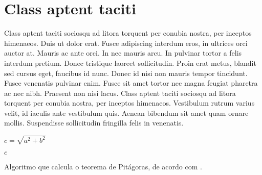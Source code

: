 \documentclass[rascunho,xindy]{fei}
\begin{document}
\section{Class aptent taciti}

Class aptent taciti sociosqu ad litora torquent per conubia nostra, per  inceptos himenaeos. Duis ut dolor erat. Fusce adipiscing interdum eros, in ultrices orci auctor at. Mauris ac ante orci. In nec mauris arcu. In pulvinar tortor a felis interdum pretium. Donec tristique laoreet sollicitudin. Proin erat metus, blandit sed cursus eget, faucibus id nunc. Donec id nisi non mauris tempor tincidunt. Fusce venenatis pulvinar enim. Fusce sit amet tortor nec magna feugiat pharetra ac nec nibh. Praesent non nisi lacus. Class aptent taciti sociosqu ad litora torquent per conubia nostra, per inceptos himenaeos. Vestibulum rutrum varius velit, id iaculis ante vestibulum quis. Aenean bibendum sit amet quam ornare mollis. Suspendisse sollicitudin fringilla felis in venenatis.

\begin{algorithm}

\(c=\sqrt{a^2 + b^2}\)

\Retorna \(c\)

\caption{Algoritmo que calcula o teorema de Pitágoras, de acordo com .}
\label{lst:alg}
\end{algorithm}



\printindex
\end{document}
